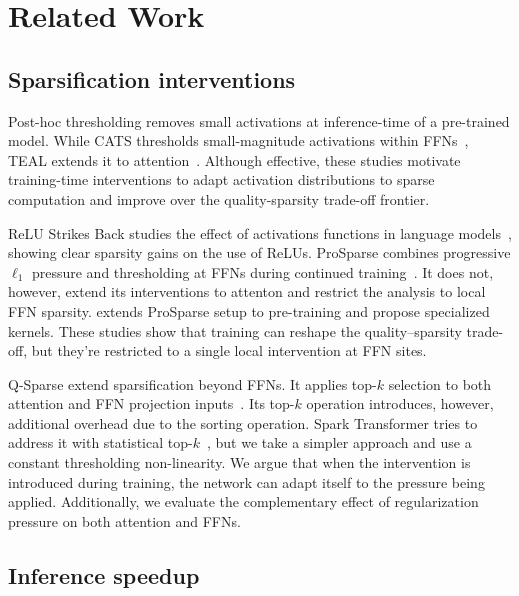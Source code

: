 \section{Related Work}
\label{sec:related-work}

\subsection{Sparsification interventions}
\label{sec:related-interventions}

Post-hoc thresholding removes small activations at inference-time of a pre-trained model. While CATS thresholds small-magnitude activations within FFNs~\citep{lee2024cats}, TEAL extends it to attention~\citep{liu2024teal}. Although effective, these studies motivate training-time interventions to adapt activation distributions to sparse computation and improve over the quality-sparsity trade-off frontier.

ReLU Strikes Back studies the effect of activations functions in language models~\citep{mirzadeh2023relu}, showing clear sparsity gains on the use of ReLUs. ProSparse combines progressive $\ell_1$ pressure and thresholding at FFNs during continued training~\citep{song2024prosparse}. It does not, however, extend its interventions to attenton and restrict the analysis to local FFN sparsity. \citet{cetin2026sparser} extends ProSparse setup to pre-training and propose specialized kernels. These studies show that training can reshape the quality--sparsity trade-off, but they're restricted to a single local intervention at FFN sites.

Q-Sparse extend sparsification beyond FFNs. It applies top-$k$ selection to both attention and FFN projection inputs~\citep{wang2024qsparse}. Its top-$k$ operation introduces, however, additional overhead due to the sorting operation. Spark Transformer tries to address it with statistical top-$k$~\citep{you2025spark}, but we take a simpler approach and use a constant thresholding non-linearity. We argue that when the intervention is introduced during training, the network can adapt itself to the pressure being applied. Additionally, we evaluate the complementary effect of regularization pressure on both attention and FFNs.

\subsection{Inference speedup}
\label{sec:related-speedup}

